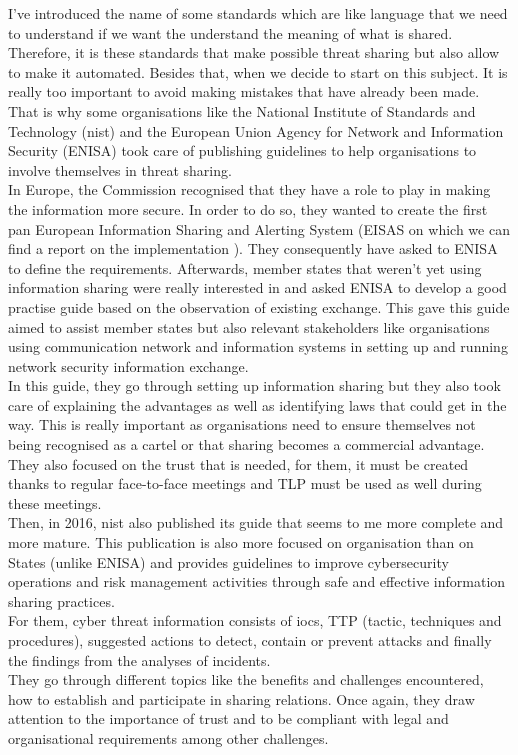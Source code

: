 \documentclass{eplmastersthesis}
\begin{document}
I've introduced the name of some standards which are like language that we need to understand if we want the understand the meaning of what is shared. Therefore, it is these standards that make possible threat sharing but also allow to make it automated. Besides that, when we decide to start on this subject. It is really too important to avoid making mistakes that have already been made. That is why some organisations like the National Institute of Standards and Technology (\gls{nist}) and the European Union Agency for Network and Information Security (ENISA) took care of publishing guidelines to help organisations to involve themselves in threat sharing.\\
In Europe, the Commission recognised that they have a role to play in making the information more secure. In order to do so, they wanted to create the first pan European Information Sharing and Alerting System (EISAS on which we can find a report on the implementation \cite{eisasRapport}).  They consequently have asked to ENISA to define the requirements. Afterwards, member states that weren't yet using information sharing were really interested in and asked ENISA to develop a good practise guide based on the observation of existing exchange. This gave this guide \cite{enisaguide2009} aimed to assist member states but also relevant stakeholders like organisations using communication network and information systems in setting up and running network security information exchange.\\
In this guide, they go through setting up information sharing but they also took care of explaining the advantages as well as identifying laws that could get in the way. This is really important as organisations need to ensure themselves not being recognised as a cartel or that sharing becomes a commercial advantage. They also focused on the trust that is needed, for them, it must be created thanks to regular face-to-face meetings and TLP must be used as well during these meetings.\\
Then, in 2016, \gls{nist} also published its guide \cite{johnson2014guide} that seems to me more complete and more mature. This publication is also more focused on organisation than on States (unlike ENISA) and provides guidelines to improve cybersecurity operations and risk management activities through safe and effective information sharing practices.\\
For them, cyber threat information consists of \gls{ioc}s, TTP (tactic, techniques and procedures), suggested actions to detect, contain or prevent attacks and finally the findings from the analyses of incidents. \\
They go through different topics like the benefits and challenges encountered, how to establish and participate in sharing relations. Once again, they draw attention to the importance of trust and to be compliant with legal and organisational requirements among other challenges.\\
\end{document}
